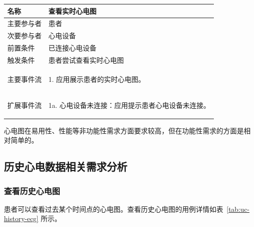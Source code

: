 \begin{table}[!ht]
    \label{tab:uc-real-time-ecg}
    \begin{tabularx}{\textwidth}{|l|X|}
        \hline
        名称    & 查看实时心电图     \\
        \hline
        主要参与者 & 患者          \\
        \hline
        次要参与者 & 心电设备        \\
        \hline
        前置条件  & 已连接心电设备     \\
        \hline
        触发条件  & 患者尝试查看实时心电图 \\
        \hline
        主要事件流 &
        \begin{itemizec}
            \item[1.] 应用展示患者的实时心电图。
        \end{itemizec} \\
        \hline
        扩展事件流 &
        \begin{itemizec}
            \item[1a.] 心电设备未连接：应用提示患者心电设备未连接。
        \end{itemizec} \\
        \hline
    \end{tabularx}
\end{table}

心电图在易用性、性能等非功能性需求方面要求较高，但在功能性需求的方面是相对简单的。

\subsection{历史心电数据相关需求分析}\label{subsec:history-req}

\subsubsection{查看历史心电图}

患者可以查看过去某个时间点的心电图。查看历史心电图的用例详情如表~\ref{tab:uc-history-ecg} 所示。

